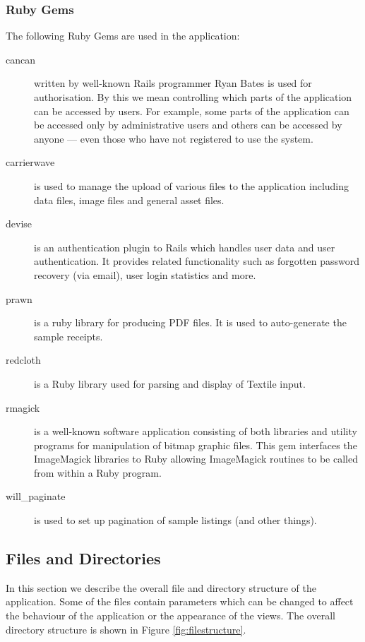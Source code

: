 \documentclass[12pt,twoside]{article}
\begin{document}
\subsubsection{Ruby Gems}
The following Ruby Gems are used in the application:
\begin{description}
\item[cancan\cite{cancan}]
written by well-known Rails programmer Ryan Bates is used for
authorisation. By this we mean controlling which parts of the application
can be accessed by users. For example, some parts of the application can
be accessed only by administrative users and others can be accessed by
anyone --- even those who have not registered to use the system.
\item[carrierwave\cite{carrierwave}]
is used to manage the upload of various files to the application
including data files, image files and general asset files.
\item[devise\cite{devise}]
is an authentication plugin to Rails which handles user data and
user authentication. It provides related functionality such as forgotten
password recovery (via email), user login statistics and more.
\item[prawn\cite{prawn}]
is a ruby library for producing PDF files. It is used to
auto-generate the sample receipts.
\item[redcloth\cite{redcloth}]
is a Ruby library used for parsing and display of Textile input.
\item[rmagick\cite{rmagick}]
is a well-known software application consisting of both
libraries and utility programs for manipulation of bitmap graphic files.
This gem interfaces the ImageMagick libraries to Ruby allowing
ImageMagick routines to be called from within a Ruby program.
\item[will\_paginate\cite{willp}]
is used to set up pagination of sample listings (and other things).
\end{description}

\subsection{Files and Directories}
In this section we describe the overall file and directory structure
of the application. Some of the files contain parameters which can be
changed to affect the behaviour of the application or the appearance
of the views. The overall directory structure is shown in
Figure \ref{fig:filestructure}.
\end{document}
